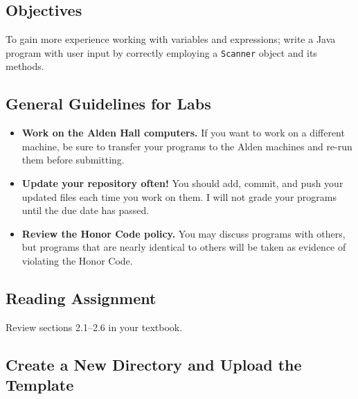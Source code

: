 



\vspace{-0.15in}
\subsection*{Objectives}

To gain more experience working with variables and expressions; write a Java program with user input by correctly
employing a {\tt Scanner} object and its methods.

\vspace{-0.15in}
\subsection*{General Guidelines for Labs}
\begin{itemize}
\item
{\bf Work on the Alden Hall computers.} If you want to work on a different
machine, be sure to transfer your programs to the Alden
machines and re-run them before submitting.
\item
{\bf Update your repository often!} You should add, commit, 
and push your updated files each time you work on them.  I will not grade 
your programs until the due date has passed.
\item
{\bf Review the Honor Code policy.} You
may discuss programs with others, but programs that are nearly identical
to others will be taken as evidence of violating the Honor Code.
\end{itemize}

\vspace{-0.15in}
\subsection*{Reading Assignment}

Review sections 2.1--2.6 in your textbook. 

\vspace{-0.15in}
\subsection*{Create a New Directory and Upload the Template}

